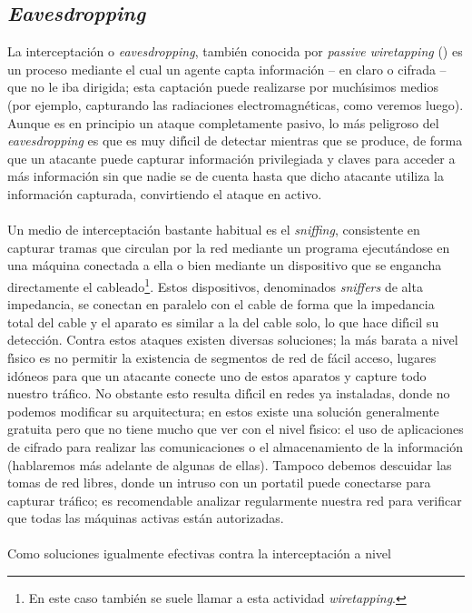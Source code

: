 \subsection{{\it Eavesdropping}}
\label{eavesdropping}
La interceptaci\'on o {\it eavesdropping}, tambi\'en conocida por {\it passive
wiretapping} (\cite{kn:cesid}) es un proceso mediante el cual un agente capta
informaci\'on -- en claro o cifrada -- que no le iba dirigida; esta
captaci\'on puede realizarse por much\'{\i}simos medios (por ejemplo, 
capturando las radiaciones electromagn\'eticas, como veremos luego). Aunque es
en principio un ataque completamente pasivo, lo m\'as
peligroso del {\it eavesdropping} es que es muy dif\'{\i}cil de detectar
mientras que se produce, de forma que un atacante puede capturar informaci\'on
privilegiada y claves para acceder a m\'as informaci\'on sin que nadie se de
cuenta hasta que dicho atacante utiliza la informaci\'on capturada, 
convirtiendo el ataque en activo.\\
\\Un medio de interceptaci\'on bastante habitual es el {\it sniffing}, 
consistente en capturar tramas que circulan por la red mediante un programa 
ejecut\'andose en una m\'aquina conectada a ella o bien mediante un dispositivo
que se engancha directamente el cableado\footnote{En este caso tambi\'en se 
suele llamar a esta actividad {\it wiretapping}.}. Estos dispositivos, 
denominados {\it 
sniffers} de alta impedancia, se conectan en paralelo con el cable de forma que
la impedancia total del cable y el aparato es similar a la del cable solo, lo
que hace dif\'{\i}cil su detecci\'on. Contra estos ataques existen diversas
soluciones; la m\'as barata a nivel f\'{\i}sico es no permitir la existencia de 
segmentos de red de f\'acil acceso, lugares id\'oneos para que un atacante 
conecte uno de estos aparatos y capture todo nuestro tr\'afico. No obstante
esto resulta dif\'{\i}cil en redes ya instaladas, donde no podemos modificar
su arquitectura; en estos existe una soluci\'on generalmente gratuita pero que
no tiene mucho que ver con el nivel f\'{\i}sico: el uso de aplicaciones de
cifrado para realizar las comunicaciones o el almacenamiento de la informaci\'on
(hablaremos m\'as adelante de algunas de ellas). Tampoco debemos descuidar las
tomas de red libres, donde un intruso con un portatil puede conectarse para
capturar tr\'afico; es recomendable analizar regularmente nuestra red para
verificar que todas las m\'aquinas activas est\'an autorizadas.\\
\\Como soluciones igualmente efectivas contra la interceptaci\'on a nivel
